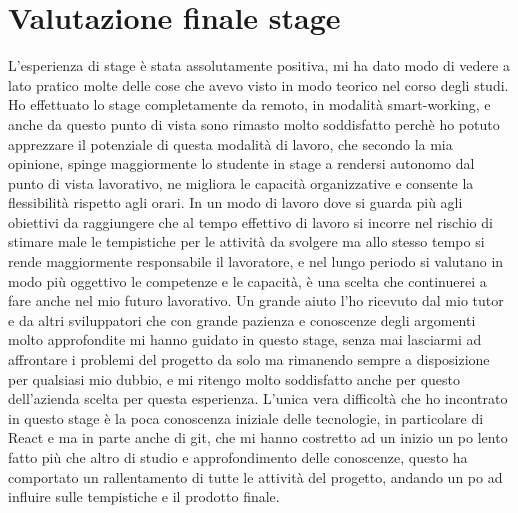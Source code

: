 \section{Valutazione finale stage}
\label{sec:valutazione-finale-stage}
L'esperienza di stage è stata assolutamente positiva, mi ha dato modo di vedere a lato pratico molte delle cose che avevo visto in modo teorico nel corso degli studi. Ho effettuato lo
stage completamente da remoto, in modalità smart-working, e anche da questo punto di vista sono rimasto molto soddisfatto perchè ho potuto apprezzare il potenziale di questa modalità di
lavoro, che secondo la mia opinione, spinge maggiormente lo studente in stage a rendersi autonomo dal punto di vista lavorativo, ne migliora le capacità organizzative e consente la flessibilità
rispetto agli orari. In un modo di lavoro dove si guarda più agli obiettivi da raggiungere che al tempo effettivo di lavoro si incorre nel rischio di stimare male le tempistiche per le
attività da svolgere ma allo stesso tempo si rende maggiormente responsabile il lavoratore, e nel lungo periodo si valutano in modo più oggettivo le competenze e le capacità, è una
scelta che continuerei a fare anche nel mio futuro lavorativo. Un grande aiuto l'ho ricevuto dal mio tutor e da altri sviluppatori che con grande pazienza e conoscenze degli
argomenti molto approfondite mi hanno guidato in questo stage, senza mai lasciarmi ad affrontare i problemi del progetto da solo ma rimanendo sempre a disposizione per qualsiasi mio dubbio,
e mi ritengo molto soddisfatto anche per questo dell'azienda scelta per questa esperienza. L'unica vera difficoltà che ho incontrato in questo stage è la poca conoscenza iniziale delle
tecnologie, in particolare di React e ma in parte anche di git, che mi hanno costretto ad un inizio un po lento fatto più che altro di studio e approfondimento delle conoscenze, questo ha
comportato un rallentamento di tutte le attività del progetto, andando un po ad influire sulle tempistiche e il prodotto finale.
